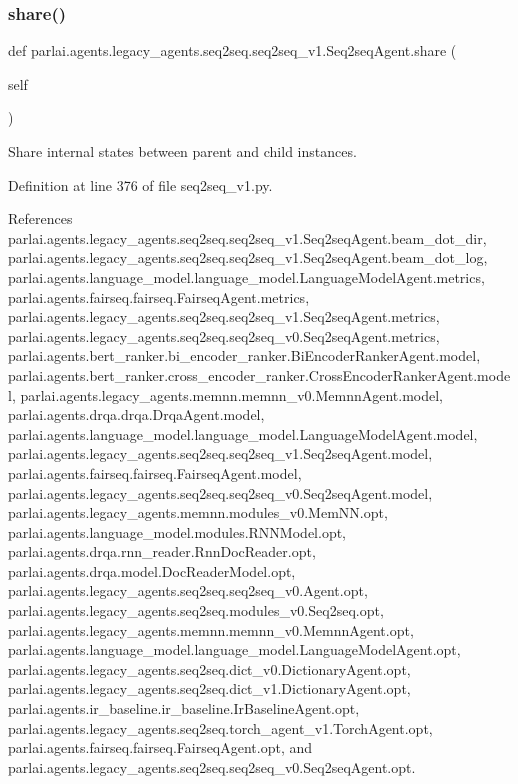 \subsubsection{\texorpdfstring{share()}{share()}}
{\footnotesize\ttfamily def parlai.\+agents.\+legacy\+\_\+agents.\+seq2seq.\+seq2seq\+\_\+v1.\+Seq2seq\+Agent.\+share (\begin{DoxyParamCaption}\item[{}]{self }\end{DoxyParamCaption})}

\begin{DoxyVerb}Share internal states between parent and child instances.\end{DoxyVerb}
 

Definition at line 376 of file seq2seq\+\_\+v1.\+py.



References parlai.\+agents.\+legacy\+\_\+agents.\+seq2seq.\+seq2seq\+\_\+v1.\+Seq2seq\+Agent.\+beam\+\_\+dot\+\_\+dir, parlai.\+agents.\+legacy\+\_\+agents.\+seq2seq.\+seq2seq\+\_\+v1.\+Seq2seq\+Agent.\+beam\+\_\+dot\+\_\+log, parlai.\+agents.\+language\+\_\+model.\+language\+\_\+model.\+Language\+Model\+Agent.\+metrics, parlai.\+agents.\+fairseq.\+fairseq.\+Fairseq\+Agent.\+metrics, parlai.\+agents.\+legacy\+\_\+agents.\+seq2seq.\+seq2seq\+\_\+v1.\+Seq2seq\+Agent.\+metrics, parlai.\+agents.\+legacy\+\_\+agents.\+seq2seq.\+seq2seq\+\_\+v0.\+Seq2seq\+Agent.\+metrics, parlai.\+agents.\+bert\+\_\+ranker.\+bi\+\_\+encoder\+\_\+ranker.\+Bi\+Encoder\+Ranker\+Agent.\+model, parlai.\+agents.\+bert\+\_\+ranker.\+cross\+\_\+encoder\+\_\+ranker.\+Cross\+Encoder\+Ranker\+Agent.\+model, parlai.\+agents.\+legacy\+\_\+agents.\+memnn.\+memnn\+\_\+v0.\+Memnn\+Agent.\+model, parlai.\+agents.\+drqa.\+drqa.\+Drqa\+Agent.\+model, parlai.\+agents.\+language\+\_\+model.\+language\+\_\+model.\+Language\+Model\+Agent.\+model, parlai.\+agents.\+legacy\+\_\+agents.\+seq2seq.\+seq2seq\+\_\+v1.\+Seq2seq\+Agent.\+model, parlai.\+agents.\+fairseq.\+fairseq.\+Fairseq\+Agent.\+model, parlai.\+agents.\+legacy\+\_\+agents.\+seq2seq.\+seq2seq\+\_\+v0.\+Seq2seq\+Agent.\+model, parlai.\+agents.\+legacy\+\_\+agents.\+memnn.\+modules\+\_\+v0.\+Mem\+N\+N.\+opt, parlai.\+agents.\+language\+\_\+model.\+modules.\+R\+N\+N\+Model.\+opt, parlai.\+agents.\+drqa.\+rnn\+\_\+reader.\+Rnn\+Doc\+Reader.\+opt, parlai.\+agents.\+drqa.\+model.\+Doc\+Reader\+Model.\+opt, parlai.\+agents.\+legacy\+\_\+agents.\+seq2seq.\+seq2seq\+\_\+v0.\+Agent.\+opt, parlai.\+agents.\+legacy\+\_\+agents.\+seq2seq.\+modules\+\_\+v0.\+Seq2seq.\+opt, parlai.\+agents.\+legacy\+\_\+agents.\+memnn.\+memnn\+\_\+v0.\+Memnn\+Agent.\+opt, parlai.\+agents.\+language\+\_\+model.\+language\+\_\+model.\+Language\+Model\+Agent.\+opt, parlai.\+agents.\+legacy\+\_\+agents.\+seq2seq.\+dict\+\_\+v0.\+Dictionary\+Agent.\+opt, parlai.\+agents.\+legacy\+\_\+agents.\+seq2seq.\+dict\+\_\+v1.\+Dictionary\+Agent.\+opt, parlai.\+agents.\+ir\+\_\+baseline.\+ir\+\_\+baseline.\+Ir\+Baseline\+Agent.\+opt, parlai.\+agents.\+legacy\+\_\+agents.\+seq2seq.\+torch\+\_\+agent\+\_\+v1.\+Torch\+Agent.\+opt, parlai.\+agents.\+fairseq.\+fairseq.\+Fairseq\+Agent.\+opt, and parlai.\+agents.\+legacy\+\_\+agents.\+seq2seq.\+seq2seq\+\_\+v0.\+Seq2seq\+Agent.\+opt.

